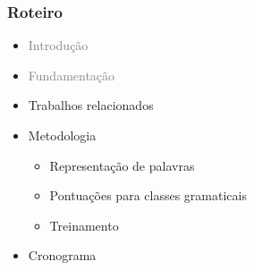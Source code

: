 \documentclass[10pt]{beamer}
\begin{document}
\begin{frame}
  \frametitle{Roteiro}


  \begin{itemize}

  \vspace{-1em}

    
    \item[\color{gray}{$\bullet$}] \textcolor{gray}{Introdução}
    
    \begin{itemize}
    \end{itemize}


    
    \item[\color{gray}{$\bullet$}] \textcolor{gray}{Fundamentação}

    \begin{itemize}
      \color{gray}{
      \item[\ ] Aprendizado de máquina
      \item[\ ] Córpus
      \item[\ ] Representação de palavras
      \item[\ ] Redes neurais
      \item[\ ] Aprendizagem profunda
      }
    \end{itemize}


    
    \item Trabalhos relacionados

    \color{gray}
    \item[\color{gray}{$\bullet$}] Metodologia

    \begin{itemize}
      \color{gray}
      \item[\ ] Representação de palavras
      \item[\ ] Pontuações para classes gramaticais
      \item[\ ] Treinamento
    \end{itemize}

    \color{gray}
    \item[\color{gray}{$\bullet$}] Cronograma

  \end{itemize}

\end{frame}
\end{document}
